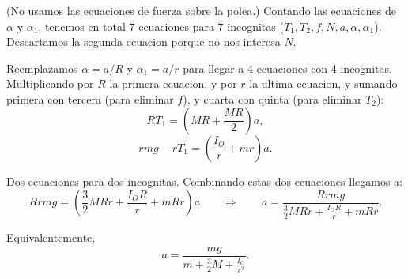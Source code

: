 \begin{enumerate}[a)]
(No usamos las ecuaciones de fuerza sobre la polea.) Contando las ecuaciones de $\alpha$ y $\alpha_1$, tenemos en total 7 ecuaciones para 7 incognitas ($T_1,T_2,f,N,a,\alpha,\alpha_1$). Descartamos la segunda ecuacion porque no nos interesa $N$.

Reemplazamos $\alpha=a/R$ y $\alpha_1=a/r$ para llegar a 4 ecuaciones con 4 incognitas. Multiplicando por $R$ la primera ecuacion, y por $r$ la ultima ecuacion, y sumando primera con tercera (para eliminar $f$), y cuarta con quinta (para eliminar $T_2$):
\[
RT_1=\left(MR+\frac{MR}{2}\right)a,
\]
\[
rmg-rT_1=\left(\frac{I_O}{r}+mr\right)a.
\]

Dos ecuaciones para dos incognitas. Combinando estas dos ecuaciones llegamos a:
\[
Rrmg=\left(\frac{3}{2}MRr+\frac{I_OR}{r}+mRr\right)a
\qquad\Rightarrow\qquad
a=\frac{Rrmg}{\frac{3}{2}MRr+\frac{I_OR}{r}+mRr}.
\]

Equivalentemente,
\[
\boxed{a=\frac{mg}{m+\frac{3}{2}M+\frac{I_O}{r^2}}}.
\]
\end{enumerate}
